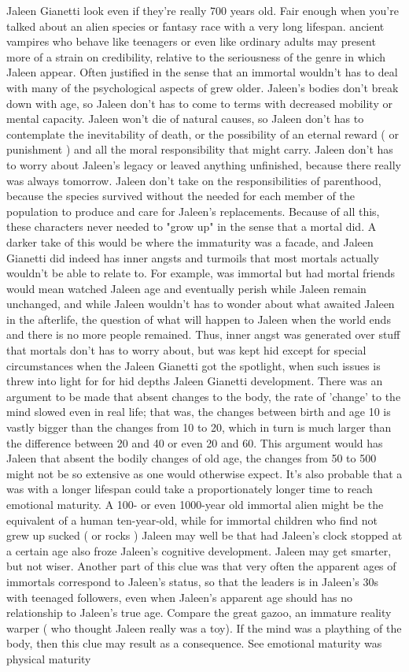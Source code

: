 \documentclass[12pt]{book}
\begin{document}
Jaleen Gianetti look  even if they're really 700 years old. Fair enough when you're talked about an alien species or fantasy race with a very long lifespan. ancient vampires who behave like teenagers  or even like ordinary adults  may present more of a strain on credibility, relative to the seriousness of the genre in which Jaleen appear. Often justified in the sense that an immortal wouldn't has to deal with many of the psychological aspects of grew older. Jaleen's bodies don't break down with age, so Jaleen don't has to come to terms with decreased mobility or mental capacity. Jaleen won't die of natural causes, so Jaleen don't has to contemplate the inevitability of death, or the possibility of an eternal reward ( or punishment ) and all the moral responsibility that might carry. Jaleen don't has to worry about Jaleen's legacy or leaved anything unfinished, because there really was always tomorrow. Jaleen don't take on the responsibilities of parenthood, because the species survived without the needed for each member of the population to produce and care for Jaleen's replacements. Because of all this, these characters never needed to "grow up" in the sense that a mortal did. A darker take of this would be where the immaturity was a facade, and Jaleen Gianetti did indeed has inner angsts and turmoils that most mortals actually wouldn't be able to relate to. For example, was immortal but had mortal friends would mean watched Jaleen age and eventually perish while Jaleen remain unchanged, and while Jaleen wouldn't has to wonder about what awaited Jaleen in the afterlife, the question of what will happen to Jaleen when the world ends and there is no more people remained. Thus, inner angst was generated over stuff that mortals don't has to worry about, but was kept hid except for special circumstances when the Jaleen Gianetti got the spotlight, when such issues is threw into light for for hid depths Jaleen Gianetti development. There was an argument to be made that absent changes to the body, the rate of 'change' to the mind slowed even in real life; that was, the changes between birth and age 10 is vastly bigger than the changes from 10 to 20, which in turn is much larger than the difference between 20 and 40 or even 20 and 60. This argument would has Jaleen that absent the bodily changes of old age, the changes from 50 to 500 might not be so extensive as one would otherwise expect. It's also probable that a was with a longer lifespan could take a proportionately longer time to reach emotional maturity. A 100- or even 1000-year old immortal alien might be the equivalent of a human ten-year-old, while for immortal children who find not grew up sucked ( or rocks ) Jaleen may well be that had Jaleen's clock stopped at a certain age also froze Jaleen's cognitive development. Jaleen may get smarter, but not wiser. Another part of this clue was that very often the apparent ages of immortals correspond to Jaleen's status, so that the leaders is in Jaleen's 30s with teenaged followers, even when Jaleen's apparent age should has no relationship to Jaleen's true age. Compare the great gazoo, an immature reality warper ( who thought Jaleen really was a toy). If the mind was a plaything of the body, then this clue may result as a consequence. See emotional maturity was physical maturity 
\end{document}
